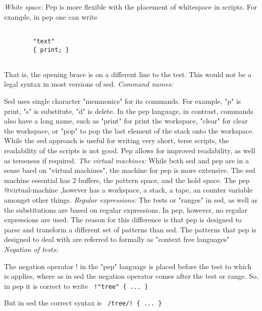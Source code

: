 \documentclass[a4paper,12pt]{article}
\begin{document}
 \emph{ White space: }
      Pep is more flexible with the placement of whitespace in
      scripts. For example, in pep one can write 
 \begin{lstlisting}[breaklines] 

        "text" 
        { print; }
      
 \end{lstlisting} 


      That is, the opening brace is on a different line to the
      test. This would not be a legal syntax in most versions of sed.
 \emph{ Command names: }

      Sed uses single character "memnonics" for its commands. For example,
      "p" is print, "s" is substitute, "d" is delete. In the pep
      language, in contrast, commands also have a long name, such as
      "print" for print the workspace, "clear" for clear the workspace, or
      "pop" to pop the last element of the stack onto the workspace.
      While the sed approach is useful for writing very short, terse
      scripts, the readability of the scripts is not good. Pep allows
      for improved readability, as well as terseness if required.
 \emph{ The virtual machines: }
      While both sed and pep are in a sense baed on
      "virtual machines", the machine for pep is more
      extensive. The sed machine essential has 2 buffers, the pattern space,
      and the hold space. The pep @virtual-machine ,however has a
      workspace, a stack, a tape, an counter variable amongst other things.
 \emph{ Regular expressions: }
     The tests or "ranges" in sed, as well as the substitutions are based
     on regular expressions. In pep, however, no regular expressions are
     used. The reason for this difference is that pep is designed to
     parse and transform a different set of patterns than sed. The patterns
     that pep is designed to deal with are referred to formally as
     "context free languages"
 \emph{ Negation of tests: }

     The negation operator ! in the "pep" language is placed
     before the test to which is applies, where as in sed the
     negation operator comes after the test or range. So,
     in pep it is correct to write 
 \verb| !"tree" { ... } |

     But in sed the correct syntax is 
 \verb| /tree/! { ... } |
\end{document}
